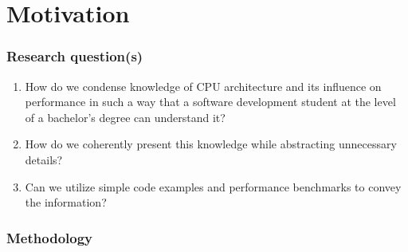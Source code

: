 

\section{Motivation}\label{motivation}


\subsubsection{Research question(s)}\label{research-questions}

\begin{enumerate}
  \item How do we condense knowledge of CPU architecture and its influence on
  performance in such a way that a software development student at the level of
  a bachelor's degree can understand it?
  \item How do we coherently present this knowledge while abstracting
  unnecessary details?
  \item Can we utilize simple code examples and performance benchmarks to convey
  the information?
\end{enumerate}

\subsubsection{Methodology}\label{methodology}



